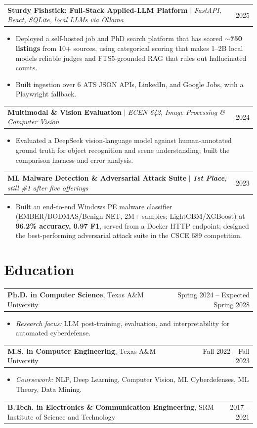 \documentclass[letterpaper,11pt]{article}
\makeatletter
\newcommand{\heading}[2]{%
  \vspace{2pt}%
  \begin{tabularx}{\textwidth}{@{}>{\raggedright\arraybackslash\small}X@{\hspace{1em}}>{\small}r@{}}
    #1 & #2 \\
  \end{tabularx}\par\vspace{-1pt}%
}
\makeatother
\begin{document}
\heading
  {\textbf{Sturdy Fishstick: Full-Stack Applied-LLM Platform} $|$ \textit{FastAPI, React, SQLite, local LLMs via Ollama}}{2025}
\begin{itemize}\small
  \item Deployed a self-hosted job and PhD search platform that has scored \textbf{$\sim$750 listings} from 10+ sources, using categorical scoring that makes 1--2B local models reliable judges and FTS5-grounded RAG that rules out hallucinated counts.
  \item Built ingestion over 6 ATS JSON APIs, LinkedIn, and Google Jobs, with a Playwright fallback.
\end{itemize}

\heading
  {\textbf{Multimodal \& Vision Evaluation} $|$ \textit{ECEN 642, Image Processing \& Computer Vision}}{2024}
\begin{itemize}\small
  \item Evaluated a DeepSeek vision-language model against human-annotated ground truth for object recognition and scene understanding; built the comparison harness and error analysis.
\end{itemize}

\heading
  {\textbf{ML Malware Detection \& Adversarial Attack Suite} $|$ \textit{\textbf{1st Place}; still \#1 after five offerings}}{2023}
\begin{itemize}\small
  \item Built an end-to-end Windows PE malware classifier (EMBER/BODMAS/Benign-NET, 2M+ samples; LightGBM/XGBoost) at \textbf{96.2\% accuracy, 0.97 F1}, served from a Docker HTTP endpoint; designed the best-performing adversarial attack suite in the CSCE 689 competition.
\end{itemize}

\section{Education}

\heading{\textbf{Ph.D. in Computer Science}, Texas A\&M University}{Spring 2024 -- Expected Spring 2028}
\begin{itemize}\small
  \item \textit{Research focus:} LLM post-training, evaluation, and interpretability for automated cyberdefense.
\end{itemize}
\heading{\textbf{M.S. in Computer Engineering}, Texas A\&M University}{Fall 2022 -- Fall 2023}
\begin{itemize}\small
  \item \textit{Coursework:} NLP, Deep Learning, Computer Vision, ML Cyberdefenses, ML Theory, Data Mining.
\end{itemize}
\heading{\textbf{B.Tech. in Electronics \& Communication Engineering}, SRM Institute of Science and Technology}{2017 -- 2021}
\end{document}

